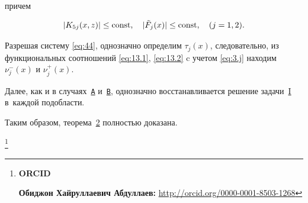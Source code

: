 причем  

$$| {{K_{5j}}(x,z)} | \le {\rm const},\quad  | {{{\tilde F}_j}(x)} | \le {\rm const},\quad  (j=1, 2).$$



Разрешая систему \eqref{eq:44}, однозначно определим $\tau _j(x)$, следовательно, из функциональных соотношений  \eqref{eq:13.1}, \eqref{eq:13.2} c учетом \eqref{eq:3.j} находим $\nu^{-} _j(x)$ и $\nu^{+} _j(x)$. 

Далее, как и в случаях~\hyperlink{abd:A}{\tt А} и~\hyperlink{abd:B}{\tt В},  однозначно восстанавливается  решение задачи~\hyperlink{abd:taskI}{I} в~каждой подобласти.



Таким образом, теорема~\hyperlink{abd:th2}{2} полностью доказана.



\smallskip



\thanks{{\bf ORCID}



{\bf  Обиджон Хайруллаевич Абдуллаев:} \url{http://orcid.org/0000-0001-8503-1268}



}





\RusRef



